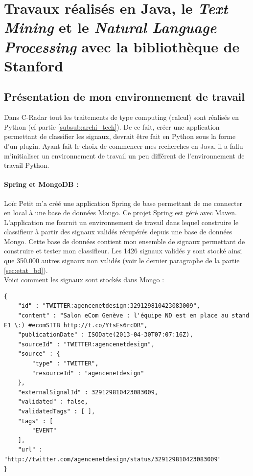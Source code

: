 \section{Travaux réalisés en Java, le \textit{Text Mining} et le \textit{Natural Language Processing} avec la bibliothèque de Stanford}
\label{sec:travaux_realises_en_java}
    \subsection{Présentation de mon environnement de travail}
        Dans C-Radar tout les traitements de type \og computing \fg (calcul) sont réalisés en Python (cf partie \ref{subsub:archi_tech}). De ce fait, créer une application permettant de classifier les signaux, devrait être fait en Python sous la forme d'un plugin. Ayant fait le choix de commencer mes recherches en Java, il a fallu m'initialiser un environnement de travail un peu différent de l'environnement de travail Python.

        \paragraph{Spring et MongoDB :}
            Loïc Petit m'a créé une application Spring de base permettant de me connecter en local à une base de données Mongo. Ce projet Spring est géré avec Maven. L'application me fournit un environnement de travail dans lequel construire le classifieur à partir des signaux validés récupérés depuis une base de données Mongo. Cette base de données contient mon ensemble de signaux permettant de construire et tester mon classifieur. Les 1426 signaux validés y sont stocké ainsi que 350.000 autres signaux non validés (voir le dernier paragraphe de la partie \ref{sec:etat_bd}).\\

        Voici comment les signaux sont stockés dans Mongo :
\begin{verbatim}
{
    "id" : "TWITTER:agencenetdesign:329129810423083009",
    "content" : "Salon eCom Genève : l'équipe ND est en place au stand E1 \:) #ecomSITB http://t.co/YtsEs6rcDR",
    "publicationDate" : ISODate(2013-04-30T07:07:16Z),
    "sourceId" : "TWITTER:agencenetdesign",
    "source" : {
        "type" : "TWITTER",
        "resourceId" : "agencenetdesign"
    },
    "externalSignalId" : 329129810423083009,
    "validated" : false,
    "validatedTags" : [ ],
    "tags" : [
        "EVENT"
    ],
    "url" : "http://twitter.com/agencenetdesign/status/329129810423083009"
}
\end{verbatim}

